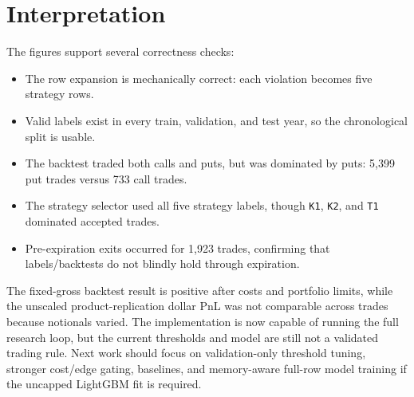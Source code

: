 \documentclass[11pt]{article}
\begin{document}
\section{Interpretation}

The figures support several correctness checks:

\begin{itemize}
  \item The row expansion is mechanically correct: each violation becomes five strategy rows.
  \item Valid labels exist in every train, validation, and test year, so the chronological split is usable.
  \item The backtest traded both calls and puts, but was dominated by puts: 5,399 put trades versus 733 call trades.
  \item The strategy selector used all five strategy labels, though \texttt{K1}, \texttt{K2}, and \texttt{T1} dominated accepted trades.
  \item Pre-expiration exits occurred for 1,923 trades, confirming that labels/backtests do not blindly hold through expiration.
\end{itemize}

The fixed-gross backtest result is positive after costs and portfolio limits, while the unscaled product-replication dollar PnL was not comparable across trades because notionals varied. The implementation is now capable of running the full research loop, but the current thresholds and model are still not a validated trading rule. Next work should focus on validation-only threshold tuning, stronger cost/edge gating, baselines, and memory-aware full-row model training if the uncapped LightGBM fit is required.
\end{document}
